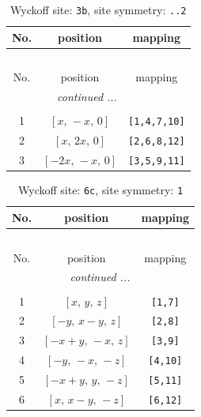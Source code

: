 \documentclass[fleqn,8pt]{jsarticle}
\begin{document}
\begin{longtable}{ccc}
\caption{Wyckoff site: {\tt 3b}, site symmetry: {\tt ..2}}
 \\
 \hline \hline
No. & position & mapping \\ \hline \endfirsthead

\multicolumn{2}{l}{\tablename\ \thetable{}} \\
 \hline \hline
No. & position & mapping \\ \hline \endhead

 \hline \hline
\multicolumn{2}{r}{\footnotesize\it continued ...} \\ \endfoot

 \hline \hline
\multicolumn{2}{r}{} \\ \endlastfoot

1 & $\left[ x,\, - x,\, 0 \right]$ & {\tt [1,4,7,10]} \\ \hline
2 & $\left[ x,\, 2 x,\, 0 \right]$ & {\tt [2,6,8,12]} \\ \hline
3 & $\left[ - 2 x,\, - x,\, 0 \right]$ & {\tt [3,5,9,11]} \\
\end{longtable}
\renewcommand{\arraystretch}{1.2}
\begin{longtable}{ccc}
\caption{Wyckoff site: {\tt 6c}, site symmetry: {\tt 1}}
 \\
 \hline \hline
No. & position & mapping \\ \hline \endfirsthead

\multicolumn{2}{l}{\tablename\ \thetable{}} \\
 \hline \hline
No. & position & mapping \\ \hline \endhead

 \hline \hline
\multicolumn{2}{r}{\footnotesize\it continued ...} \\ \endfoot

 \hline \hline
\multicolumn{2}{r}{} \\ \endlastfoot

1 & $\left[ x,\, y,\, z \right]$ & {\tt [1,7]} \\ \hline
2 & $\left[ - y,\, x - y,\, z \right]$ & {\tt [2,8]} \\ \hline
3 & $\left[ - x + y,\, - x,\, z \right]$ & {\tt [3,9]} \\ \hline
4 & $\left[ - y,\, - x,\, - z \right]$ & {\tt [4,10]} \\ \hline
5 & $\left[ - x + y,\, y,\, - z \right]$ & {\tt [5,11]} \\ \hline
6 & $\left[ x,\, x - y,\, - z \right]$ & {\tt [6,12]} \\
\end{longtable}
\end{document}
